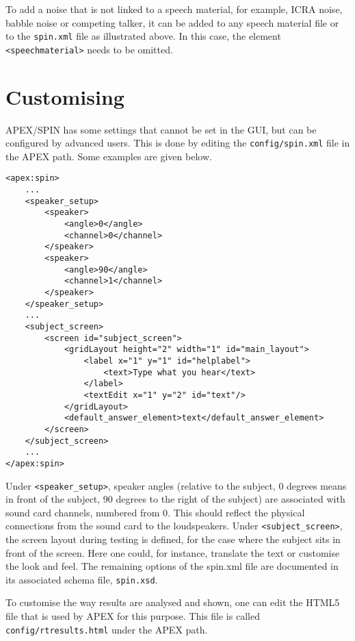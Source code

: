 To add a noise that is not linked to a speech material, for example, ICRA noise, babble noise or competing talker,
it can be added to any speech material file or to the \texttt{spin.xml}
file as illustrated above. In this case, the element
\texttt{<speechmaterial>} needs to be omitted.

\section{Customising}
\label{sec:customising}

APEX/SPIN has some settings that cannot be set in the GUI, but can be
configured by advanced users. This is done by editing the
\texttt{config/spin.xml} file in the APEX path. Some examples are given
below.

\begin{lstlisting}[caption=Specifying speaker locations and a custom screen]
<apex:spin>
    ...
    <speaker_setup>
        <speaker> 
            <angle>0</angle>    
            <channel>0</channel>
        </speaker>
        <speaker>
            <angle>90</angle>
            <channel>1</channel>
        </speaker>
    </speaker_setup>
    ...
    <subject_screen>
        <screen id="subject_screen">
            <gridLayout height="2" width="1" id="main_layout">
                <label x="1" y="1" id="helplabel">
                    <text>Type what you hear</text>
                </label>
                <textEdit x="1" y="2" id="text"/>
            </gridLayout>
            <default_answer_element>text</default_answer_element>
        </screen>
    </subject_screen>
    ...
</apex:spin>
\end{lstlisting}

Under \texttt{<speaker\_setup>}, speaker angles (relative to the
subject, 0 degrees means in front of the subject, 90 degrees to the
right of the subject) are associated with sound card channels, numbered
from 0. This should reflect the physical connections from the sound card
to the loudspeakers. Under \texttt{<subject\_screen>}, the screen layout
during testing is defined, for the case where the subject sits in front
of the screen. Here one could, for instance, translate the text or
customise the look and feel. The remaining options of the spin.xml file
are documented in its associated schema file, \texttt{spin.xsd}.

To customise the way results are analysed and shown, one can edit the
HTML5 file that is used by APEX for this purpose. This file is called
\texttt{config/rtresults.html} under the APEX path.

